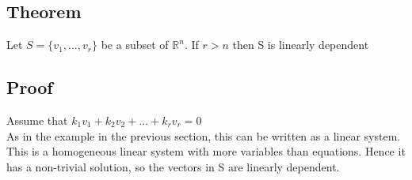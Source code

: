 \documentclass{article}[18pt]
\begin{document}
\subsection{Theorem}
Let $S=\{v_1,...,v_r\}$ be a subset of $\mathbb{ R }^n$. If $r>n$ then S is linearly dependent
\subsection{Proof}
Assume that $k_1v_1+k_2v_2+...+k_rv_r=0$\\
As in the example in the previous section, this can be written as a linear system. This is a homogeneous linear system with more variables than equations. Hence it has a non-trivial solution, so the vectors in S are linearly dependent.
\end{document}
